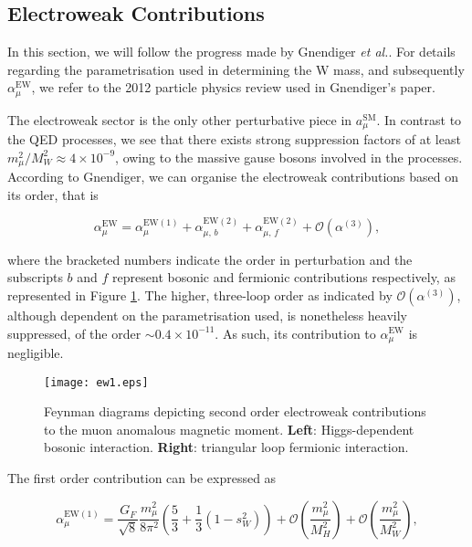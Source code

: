 \documentclass{article}
\numberwithin{equation}{section} %
\begin{document}
\subsection{Electroweak Contributions}

In this section, we will follow the progress made by Gnendiger \textit{et al.}\cite{gnendiger}. For details regarding the parametrisation used in determining the W mass, and subsequently $\alpha_\mu^\mathrm{EW}$, we refer to the 2012 particle physics review\cite{particle_review} used in Gnendiger's paper.

The electroweak sector is the only other perturbative piece in $a_\mu^\mathrm{SM}$. In contrast to the QED processes, we see that there exists strong suppression factors of at least $m_\mu^2/ M_W^2\approx 4\times 10^{-9}$\cite{hoecker}, owing to the massive gause bosons involved in the processes. According to Gnendiger\cite{gnendiger}, we can organise the electroweak contributions based on its order, that is

\begin{equation}
\alpha_\mu^\mathrm{EW} = \alpha_\mu^\mathrm{EW(1)}+\alpha_{\mu,\,b}^\mathrm{EW(2)}+\alpha_{\mu,\,f}^\mathrm{EW(2)} + \mathcal{O}(\alpha^{(3)}),
\end{equation}

\noindent where the bracketed numbers indicate the order in perturbation and the subscripts $b$ and $f$ represent bosonic and fermionic contributions respectively, as represented in Figure \ref{ewfeynman}. The higher, three-loop order as indicated by $\mathcal{O}(\alpha^{(3)})$, although dependent on the parametrisation used, is nonetheless heavily suppressed, of the order $\sim 0.4\times 10^{-11}$\cite{gnendiger}. As such, its contribution to $\alpha_\mu^\mathrm{EW}$ is negligible.

\begin{figure}[t]
    \centering
    \texttt{[image: ew1.eps]}%
    \caption{Feynman diagrams depicting second order electroweak contributions to the muon anomalous magnetic moment. \textbf{Left}: Higgs-dependent bosonic interaction. \textbf{Right}: triangular loop fermionic interaction.}%
    \label{ewfeynman}%
\end{figure}

The first order contribution can be expressed as

\begin{equation}
\alpha_\mu^\mathrm{EW(1)} = \frac{G_F}{\sqrt{8}}\frac{m_\mu^2}{8\pi^2}\left(\frac{5}{3} + \frac{1}{3}(1-s_W^2)\right)+\mathcal{O}\left(\frac{m_\mu^2}{M_H^2}\right) +\mathcal{O}\left(\frac{m_\mu^2}{M_W^2}\right),
\label{ew1}
\end{equation}
\end{document}
